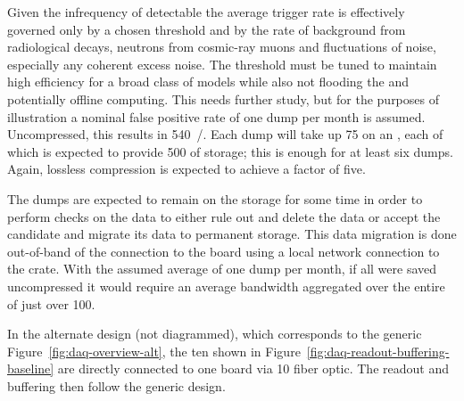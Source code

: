 Given the infrequency of detectable  the average
 trigger rate is effectively governed only by a chosen
threshold and by the rate of background from radiological decays,
neutrons from cosmic-ray muons and fluctuations of noise, especially
any coherent excess noise. 
The threshold must be tuned to maintain high efficiency for a broad
class of  models while also not flooding the  and
potentially offline computing. 
This needs further study, but for the purposes of illustration a
nominal false positive rate of one  dump per month is
assumed. 
Uncompressed, this results in \SI{540}{\TB/\year}. 
Each dump will take up \SI{75}{\GB} on an , each of which is
expected to provide \SI{500}{\GB} of storage; this is enough for
at least six dumps.
Again, lossless compression is expected to achieve a factor of five.

The  dumps are expected to remain on the 
storage for some time in order to perform checks on the data to either
rule out and delete the data or accept the candidate and migrate its
data to permanent storage. 
This data migration is done out-of-band of the connection to the
 board using a local network connection to the
 crate. 
With the assumed average of one dump per month, if all were saved
uncompressed it would require an average bandwidth aggregated over the
entire  of just over \SI{100}{\Mbps}.

In the alternate   design (not diagrammed), which
corresponds to the generic Figure~\ref{fig:daq-overview-alt}, the ten
 shown in Figure~\ref{fig:daq-readout-buffering-baseline}
are directly connected to one  board via \SI{10}{\Gbps} fiber
optic.  The readout and buffering then follow the generic design.
